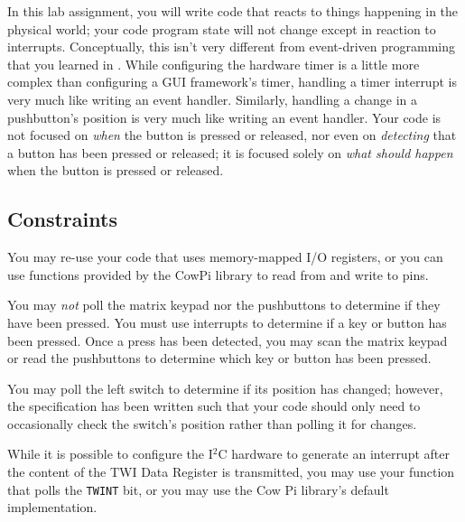 In this lab assignment, you will write code that reacts to things happening in
the physical world; your code program state will not change except in reaction to interrupts.
Conceptually, this isn't very different from event-driven programming that you
learned in \cstwo. While configuring the hardware timer is a little more complex
than configuring a GUI framework's timer, handling a timer interrupt is very
much like writing an  event handler. Similarly, handling
a change in a pushbutton's position is very much like writing an
 event handler. Your code is not focused on \textit{when}
the button is pressed or released, nor even on \textit{detecting} that a button
has been pressed or released; it is focused solely on \textit{what should happen}
when the button is pressed or released.

\subsection{Constraints} \label{sec:Constraints}


You may re-use your code that uses memory-mapped I/O registers, or you can use
functions provided by the CowPi library to read from and write to pins.

You may \textit{not} poll the matrix keypad nor the pushbuttons to determine
if they have been pressed. You must use interrupts to determine if a key or
button has been pressed. Once a press has been detected, you may scan the
matrix keypad or read the pushbuttons to determine which key or button has
been pressed.

You may poll the left switch to determine if its position has changed;
however, the specification has been written such that your code should only
need to occasionally check the switch's position rather than polling it for
changes.


While it is possible to configure the I$^2$C hardware to generate an interrupt
after the content of the TWI Data Register is transmitted, you may use your
 function that polls the \texttt{TWINT} bit, or you may
use the Cow Pi library's default implementation.

